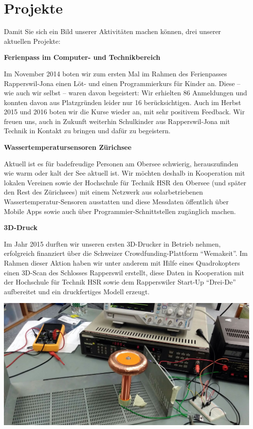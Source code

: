 \documentclass[10pt,a4paper,parskip,fleqn]{scrartcl}
\begin{document}
\section{Projekte}

Damit Sie sich ein Bild unserer Aktivitäten machen können, drei unserer
aktuellen Projekte:

\textbf{Ferienpass im Computer- und Technikbereich}

Im November 2014 boten wir zum ersten Mal im Rahmen des Ferienpasses
Rapperswil-Jona einen Löt- und einen Programmierkurs für Kinder an. Diese -- wie
auch wir selbst -- waren davon begeistert: Wir erhielten 86 Anmeldungen und
konnten davon aus Platzgründen leider nur 16 berücksichtigen. Auch im Herbst
2015 und 2016 boten wir die Kurse wieder an, mit sehr positivem Feedback. Wir
freuen uns, auch in Zukunft weiterhin Schulkinder aus Rapperswil-Jona mit
Technik in Kontakt zu bringen und dafür zu begeistern.

\textbf{Wassertemperatursensoren Zürichsee}

Aktuell ist es für badefreudige Personen am Obersee schwierig, herauszufinden
wie warm oder kalt der See aktuell ist. Wir möchten deshalb in Kooperation mit
lokalen Vereinen sowie der Hochschule für Technik HSR den Obersee (und später
den Rest des Zürichsees) mit einem Netzwerk aus solarbetriebenen
Wassertemperatur-Sensoren ausstatten und diese Messdaten öffentlich über Mobile
Apps sowie auch über Programmier-Schnittstellen zugänglich machen.

\textbf{3D-Druck}

Im Jahr 2015 durften wir unseren ersten 3D-Drucker in Betrieb nehmen,
erfolgreich finanziert über die Schweizer Crowdfunding-Plattform ``Wemakeit''.
Im Rahmen dieser Aktion haben wir unter anderem mit Hilfe eines Quadrokopters
einen 3D-Scan des Schlosses Rapperswil erstellt, diese Daten in Kooperation mit
der Hochschule für Technik HSR sowie dem Rapperswiler Start-Up ``Drei-De''
aufbereitet und ein druckfertiges Modell erzeugt.

\includegraphics[width=\textwidth]{tesla.jpg}
\end{document}
